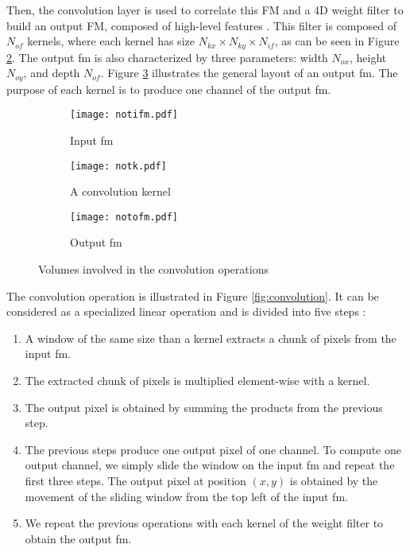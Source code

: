 Then, the convolution layer is used to correlate this FM and a 4D weight filter to build an output FM, composed of high-level features \cite{zhao_towards_2018}.
This filter is composed of $N_{of}$ kernels, where each kernel has size $N_{kx} \times N_{ky} \times N_{if}$, as can be seen in Figure \ref{fig:notation:k}. The output \acrshort{fm} is also characterized by three parameters: width $N_{ox}$, height $N_{oy}$, and depth $N_{of}$. Figure \ref{fig:notation:ofm} illustrates the general layout of an output \acrshort{fm}. The purpose of each kernel is to produce one channel of the output \acrshort{fm}.
%
\begin{figure}[H]
    \centering
    \begin{subfigure}[t]{.32\textwidth}
    \centering
    \texttt{[image: notifm.pdf]}
    \caption{Input \acrshort{fm}}
    \label{fig:notation:ifm}
    \end{subfigure}
    \begin{subfigure}[t]{.32\textwidth}
    \centering
    \texttt{[image: notk.pdf]}
    \caption{A convolution kernel}
    \label{fig:notation:k}
    \end{subfigure}
    \begin{subfigure}[t]{.32\textwidth}
    \centering
    \texttt{[image: notofm.pdf]}
    \caption{Output \acrshort{fm}}
    \label{fig:notation:ofm}
    \end{subfigure}
    \caption{Volumes involved in the convolution operations}
    \label{fig:notconv}
\end{figure}
%
The convolution operation is illustrated in Figure \ref{fig:convolution}. It can be considered as a specialized linear operation and is divided into five steps \cite{matteucci_artificial_2019, zhu_efficient_2020}:
%
\begin{enumerate}
    \item A window of the same size than a kernel extracts a chunk of pixels from the input \acrshort{fm}.
    \item The extracted chunk of pixels is multiplied element-wise with a kernel.
    \item The output pixel is obtained by summing the products from the previous step.
    \item The previous steps produce one output pixel of one channel. To compute one output channel, we simply slide the window on the input \acrshort{fm} and repeat the first three steps. The output pixel at position $(x, y)$ is obtained by the movement of the sliding window from the top left of the input \acrshort{fm}. 
    \item We repeat the previous operations with each kernel of the weight filter to obtain the output \acrshort{fm}.
\end{enumerate}
